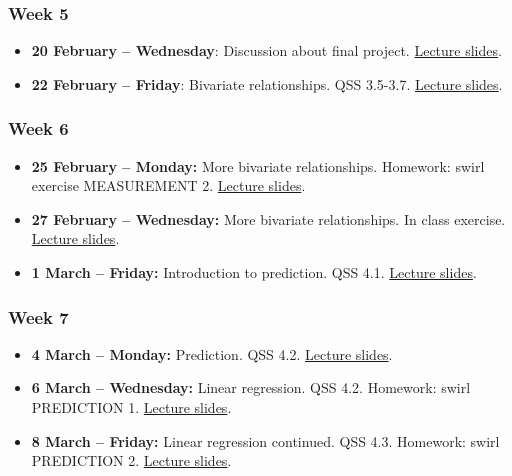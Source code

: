 \documentclass[a4paper,12pt]{article}
\begin{document}
\subsubsection*{Week 5}

\begin{itemize}
	\item \textbf{20 February -- Wednesday}: Discussion about final project. \href{https://pols1600.github.io/slides/week05b/week05b.html}{Lecture slides}.
	\item \textbf{22 February -- Friday}: Bivariate relationships. QSS 3.5-3.7. \href{https://pols1600.github.io/slides/week05c/week05c.html}{Lecture slides}.
\end{itemize}

\subsubsection*{Week 6}

\begin{itemize}
	\item \textbf{25 February -- Monday:} More bivariate relationships. Homework: swirl exercise MEASUREMENT 2. \href{https://pols1600.github.io/slides/week06a/week06a.html}{Lecture slides}.
	\item \textbf{27 February -- Wednesday:} More bivariate relationships. In class exercise. \href{https://pols1600.github.io/slides/week06b/week06b.html}{Lecture slides}.
	\item \textbf{1 March -- Friday:}  Introduction to prediction. QSS 4.1. \href{https://pols1600.github.io/slides/week06c/week06c.html}{Lecture slides}.
\end{itemize}

\subsubsection*{Week 7}

\begin{itemize}
	\item \textbf{4 March -- Monday:} Prediction. QSS 4.2. \href{https://pols1600.github.io/slides/week07a/week07a.html}{Lecture slides}.
	\item \textbf{6 March -- Wednesday:} Linear regression. QSS 4.2. Homework: swirl PREDICTION 1. \href{https://pols1600.github.io/slides/week07b/week07b.html}{Lecture slides}.
	\item \textbf{8 March -- Friday:} Linear regression continued. QSS 4.3. Homework: swirl PREDICTION 2. \href{https://pols1600.github.io/slides/week07c/week07c.html}{Lecture slides}.
\end{itemize}
\end{document}
